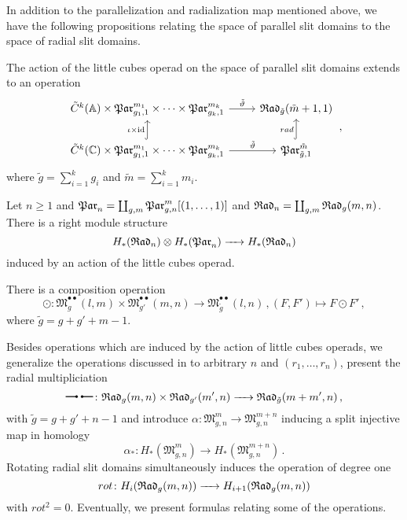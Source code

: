In addition to the parallelization and radialization map mentioned above,
we have the following propositions relating the space of parallel slit domains to the space of radial slit domains.
\begin{prop*}[Bödigheimer]
    The action of the little cubes operad on the space of parallel slit domains extends to an operation
    \[
        \begin{tikzcd}
            \tilde C^k(\A) \times \mathfrak{Par}_{g_1, 1}^{m_1} \times \dotsb \times \mathfrak{Par}_{g_k, 1}^{m_k} \arrow{r}{\tilde \vartheta} & \Radt_{\tilde g}(\tilde m + 1, 1) \\
            \tilde C^k(\C) \times \mathfrak{Par}_{g_1, 1}^{m_1} \times \dotsb \times \mathfrak{Par}_{g_k, 1}^{m_k} \arrow{r}{\tilde \vartheta} \arrow[hookrightarrow]{u}{\iota \times \text{id}} & \mathfrak{Par}_{\tilde g, 1}^{\tilde m} \arrow[hookrightarrow]{u}{rad}
        \end{tikzcd} \,,
   \]
   where $\tilde g = \sum_{i = 1}^{k} g_i$ and $\tilde m = \sum_{i = 1}^k m_i$.
\end{prop*}
\begin{prop*}[Bödigheimer]
    Let $n \ge 1$ and $\Par_n = \coprod_{g,m}\Par_{g,n}^m[(1, \ldots, 1)]$ and $\mathfrak{Rad}_n = \coprod_{g,m}{\mathfrak{Rad}_g(m,n)}$.
    There is a right module structure
    \[
        H_\ast(\mathfrak{Rad}_n) \otimes H_\ast(\mathfrak{Par}_n) \xrightarrow{\hspace{6pt}{}\hspace{6pt}} H_\ast(\mathfrak{Rad}_n)
    \]
    induced by an action of the little cubes operad.
\end{prop*}
\begin{prop*}[Bödigheimer]
    There is a composition operation
    \[
        \odot \colon \mathfrak{M}^{\bullet \bullet}_g(l, m) \times \mathfrak{M}^{\bullet \bullet}_{g'}(m, n) \to \mathfrak{M}^{\bullet \bullet}_{\tilde g}(l, n)\,, (F, F') \mapsto F \odot F'\,,
    \]
    where $\tilde g = g + g' + m - 1$.
\end{prop*}

Besides operations which are induced by the action of little cubes operads,
we generalize the operations discussed in \cite{Mehner201112} to arbitrary $n$ and $(r_1, \ldots, r_n)$, present the radial multipliciation
\[
    \radmult \colon \Rad \times \Radt_{g'}(m', n) \to \Radt_{\tilde g}(m+m', n)\,,
\]
with $\tilde g = g + g' + n - 1$ and introduce $\alpha \colon \mathfrak{M}_{g,n}^m \to \mathfrak{M}_{g,n}^{m+n}$
inducing a split injective map in homology
\[
    \alpha_\ast \colon H_\ast(\mathfrak{M}_{g,n}^m) \to H_\ast(\mathfrak{M}_{g,n}^{m+n}) \,.
\]
Rotating radial slit domains simultaneously induces the operation of degree one
\[
    rot \colon H_i({\mathfrak{Rad}_g(m,n)}) \xrightarrow{\hspace{6pt}{}\hspace{6pt}} H_{i+1}({\mathfrak{Rad}_g(m,n)})
\]
with $rot^2 = 0$.
Eventually, we present formulas relating some of the operations.

